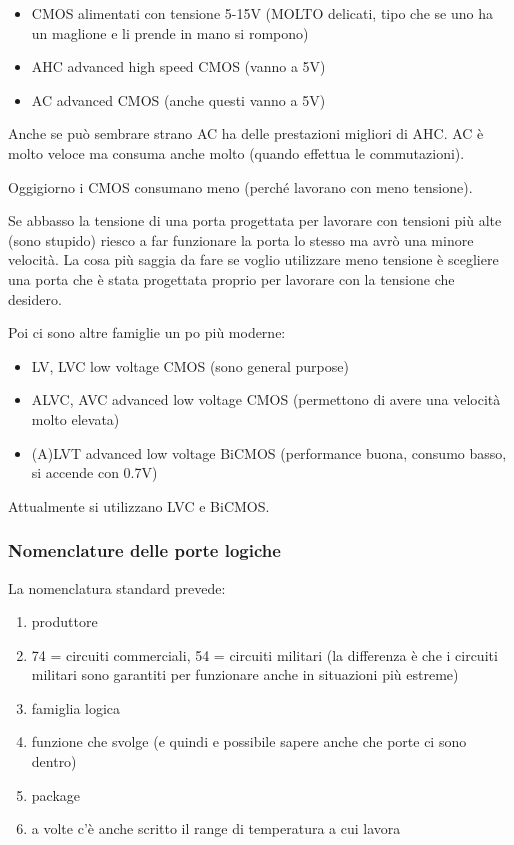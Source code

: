 \documentclass[
]{article}
\providecommand{\tightlist}{%
  \setlength{\itemsep}{0pt}\setlength{\parskip}{0pt}}
\begin{document}
\begin{itemize}
\tightlist
\item
  CMOS alimentati con tensione 5-15V (MOLTO delicati, tipo che se uno ha
  un maglione e li prende in mano si rompono)
\item
  AHC advanced high speed CMOS (vanno a 5V)
\item
  AC advanced CMOS (anche questi vanno a 5V)
\end{itemize}

Anche se può sembrare strano AC ha delle prestazioni migliori di AHC. AC
è molto veloce ma consuma anche molto (quando effettua le commutazioni).

Oggigiorno i CMOS consumano meno (perché lavorano con meno tensione).

Se abbasso la tensione di una porta progettata per lavorare con tensioni
più alte (sono stupido) riesco a far funzionare la porta lo stesso ma
avrò una minore velocità. La cosa più saggia da fare se voglio
utilizzare meno tensione è scegliere una porta che è stata progettata
proprio per lavorare con la tensione che desidero.

Poi ci sono altre famiglie un po più moderne:

\begin{itemize}
\tightlist
\item
  LV, LVC low voltage CMOS (sono general purpose)
\item
  ALVC, AVC advanced low voltage CMOS (permettono di avere una velocità
  molto elevata)
\item
  (A)LVT advanced low voltage BiCMOS (performance buona, consumo basso,
  si accende con 0.7V)
\end{itemize}

Attualmente si utilizzano LVC e BiCMOS.

\subsubsection{Nomenclature delle porte
logiche}\label{nomenclature-delle-porte-logiche}

La nomenclatura standard prevede:

\begin{enumerate}
\def\labelenumi{\arabic{enumi}.}
\tightlist
\item
  produttore
\item
  74 = circuiti commerciali, 54 = circuiti militari (la differenza è che
  i circuiti militari sono garantiti per funzionare anche in situazioni
  più estreme)
\item
  famiglia logica
\item
  funzione che svolge (e quindi e possibile sapere anche che porte ci
  sono dentro)
\item
  package
\item
  a volte c'è anche scritto il range di temperatura a cui lavora
\end{enumerate}
\end{document}
